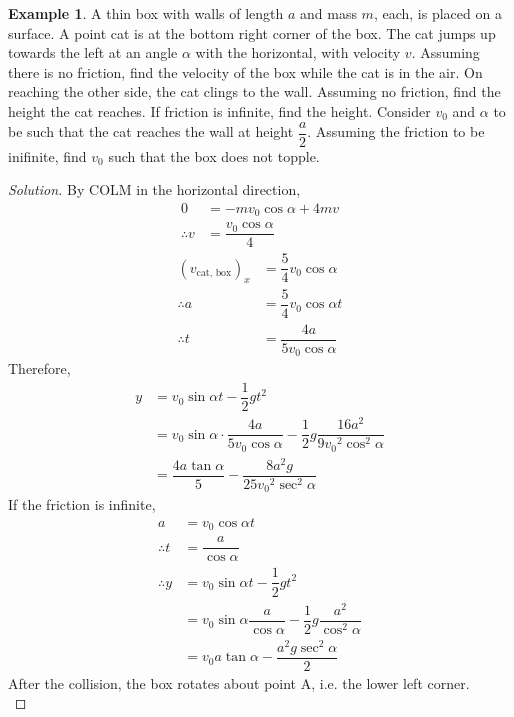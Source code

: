 \documentclass[fleqn, a4paper, 12pt]{article}
\theoremstyle{definition}
\newtheorem{example}{Example}
\theoremstyle{theorem}
\newenvironment{solution}
{\begin{proof}[Solution]\let\qed\relax}
	{\end{proof}}
\begin{document}
\begin{example}
	A thin box with walls of length $a$ and mass $m$, each, is placed on a surface. A point cat is at the bottom right corner of the box. The cat jumps up towards the left at an angle $\alpha$ with the horizontal, with velocity $v$. Assuming there is no friction, find the velocity of the box while the cat is in the air. On reaching the other side, the cat clings to the wall. Assuming no friction, find the height the cat reaches. If friction is infinite, find the height. Consider $v_0$ and $\alpha$ to be such that the cat reaches the wall at height $\dfrac{a}{2}$. Assuming the friction to be inifinite, find $v_0$ such that the box does not topple.
\end{example}

\begin{solution}
	By COLM in the horizontal direction,
	\begin{align*}
		0 &= - m v_0 \cos \alpha + 4m v\\
		\therefore v &= \dfrac{v_0 \cos \alpha}{4}
	\end{align*}
	\begin{align*}
		(v_{\text{cat, box}})_x &= \dfrac{5}{4} v_0 \cos \alpha\\
		\therefore a &= \dfrac{5}{4} v_0 \cos \alpha t\\
		\therefore t &= \dfrac{4 a}{5 v_0 \cos \alpha}
	\end{align*}
	Therefore,
	\begin{align*}
		y &= v_0 \sin \alpha t - \dfrac{1}{2} g t^2\\
		&= v_0 \sin \alpha \cdot \dfrac{4 a}{5 v_0 \cos \alpha} - \dfrac{1}{2} g \dfrac{16 a^2}{9 {v_0}^2 \cos^2 \alpha}\\
		&= \dfrac{4 a \tan \alpha}{5} - \dfrac{8 a^2 g}{25 {v_0}^2 \sec^2 \alpha}
	\end{align*}
	If the friction is infinite,
	\begin{align*}
		a &= v_0 \cos \alpha t\\
		\therefore t &= \dfrac{a}{\cos \alpha}\\
		\therefore y &= v_0 \sin \alpha t - \dfrac{1}{2} g t^2\\
		&= v_0 \sin \alpha \dfrac{a}{\cos \alpha} - \dfrac{1}{2} g \dfrac{a^2}{\cos^2 \alpha}\\
		&= v_0 a \tan \alpha - \dfrac{a^2 g \sec^2 \alpha}{2}
	\end{align*}
	After the collision, the box rotates about point A, i.e. the lower left corner.\\
\end{solution}
\end{document}
